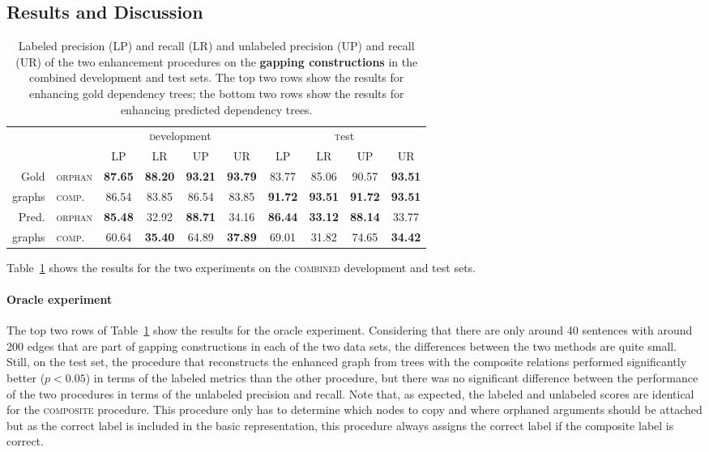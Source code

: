 \documentclass[lucida,biblatex]{sp} %
\begin{document}
\subsection{Results and Discussion}

\begin{table}
\footnotesize
\begin{tabularx}{\textwidth}{r  l   c c c c  @{\hskip 0.3in}  c c c c    }
&	&				 	\multicolumn{4}{c}{\small \textsc development}	&		\multicolumn{4}{c}{\small \textsc test}			\\
&	&					LP& LR &	UP &UR & LP& LR &	UP &UR 			\\ \midrule
Gold & \textsc{orphan} 	&	{\bf 87.65}	&{\bf 88.20}	&{\bf 93.21}	& {\bf 93.79}   & 	83.77	&  85.06	&90.57	& {\bf 93.51}	\\
graphs & \textsc{comp.}		&	86.54	&83.85	&86.54	&83.85&  	{\bf 91.72}	& {\bf 93.51}	&{\bf 91.72}	&{\bf 93.51}	\\ \midrule
Pred. &	\textsc{orphan} 	&	{\bf 85.48}	&32.92	& {\bf 88.71}	&34.16&	{\bf 86.44}	& {\bf 33.12}	& {\bf 88.14}	&33.77	\\
graphs &	\textsc{comp.}	&	60.64	& {\bf 35.40}	&64.89	& {\bf 37.89}&	69.01	&31.82	&74.65	& {\bf 34.42}	\\
\end{tabularx}
\caption{Labeled precision (LP) and recall (LR) and unlabeled precision (UP) and recall (UR)  of the two enhancement procedures on the {\bf gapping constructions} in the  {\sc combined} development and test sets. The top two rows show the results for enhancing gold dependency trees; the bottom two rows show the results for enhancing predicted dependency trees.}  \label{tbl:results-enhanced}
\end{table}

Table~\ref{tbl:results-enhanced} shows the results for the two experiments on the \textsc{combined} development and test sets.


\paragraph{Oracle experiment}
The top two rows of Table~\ref{tbl:results-enhanced} show the results for the oracle experiment. Considering that there are only around 40 sentences with around 200 edges that are part of gapping constructions in each of the two data sets, the differences between the two methods are quite small.  Still, on the test set, the procedure that reconstructs the enhanced graph from trees with the {\sc composite} relations performed significantly better ($p<0.05$) in terms of the labeled metrics than the other procedure, but there was no significant difference between the performance of the two procedures in terms of the unlabeled precision and recall.  Note that, as expected, the labeled and unlabeled scores are identical for the \textsc{composite} procedure. This procedure only has to determine which nodes to copy and where orphaned arguments should be attached but as the correct label is included in the {\sc basic} representation, this procedure always assigns the correct label if the composite label is correct.
\end{document}
